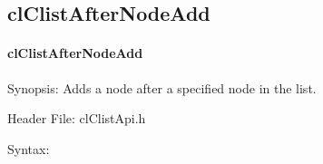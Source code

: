 \begin{flushleft}
\subsection{clClistAfterNodeAdd}
\hypertarget{pagecl104}{}\paragraph{cl\-Clist\-After\-Node\-Add}\label{pagecl104}
\begin{Desc}
\item[Synopsis:]Adds a node after a specified node in the list.\end{Desc}
\begin{Desc}
\item[Header File:]clClistApi.h\end{Desc}
\begin{Desc}
\item[Syntax:]


\end{Desc}
\end{flushleft}
